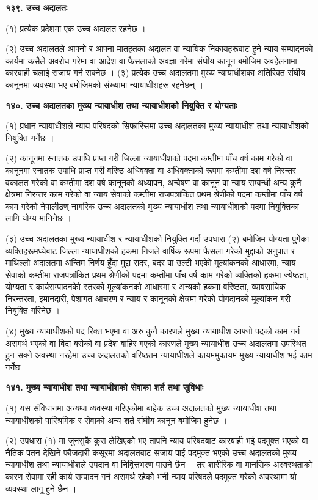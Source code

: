 \textbf{१३९. उच्च अदालतः}

(१) प्रत्येक प्रदेशमा एक उच्च अदालत रहनेछ ।

(२) उच्च अदालतले आफ्नो र आफ्ना मातहतका अदालत वा न्यायिक निकायहरूबाट हुने न्याय सम्पादनको कार्यमा कसैले अवरोध गरेमा वा आदेश वा फैसलाको अवज्ञा गरेमा संघीय कानून बमोजिम अवहेलनामा कारबाही चलाई सजाय गर्न सक्नेछ ।
(३) प्रत्येक उच्च अदालतमा मुख्य न्यायाधीशका अतिरिक्त संघीय कानूनमा व्यवस्था भए बमोजिमको संख्यामा न्यायाधीशहरू रहनेछन् ।

\textbf{१४०. उच्च अदालतका मुख्य न्यायाधीश तथा न्यायाधीशको नियुक्ति र योग्यताः}

(१) प्रधान न्यायाधीशले न्याय परिषदको सिफारिसमा उच्च अदालतका मुख्य न्यायाधीश तथा न्यायाधीशको नियुक्ति गर्नेछ ।

(२) कानूनमा स्नातक उपाधि प्राप्त गरी जिल्ला न्यायाधीशको पदमा कम्तीमा पाँच वर्ष काम गरेको वा कानूनमा स्नातक उपाधि प्राप्त गरी वरिष्ठ अधिवक्ता वा अधिवक्ताको रूपमा कम्तीमा दश वर्ष निरन्तर वकालत गरेको वा कम्तीमा दश वर्ष कानूनको अध्यापन, अन्वेषण वा कानून वा न्याय सम्बन्धी अन्य कुनै क्षेत्रमा निरन्तर काम गरेको वा न्याय सेवाको कम्तीमा राजपत्रांकित प्रथम श्रेणीको पदमा कम्तीमा पाँच वर्ष काम गरेको नेपालीठण् नागरिक उच्च अदालतको मुख्य न्यायाधीश तथा न्यायाधीशको पदमा नियुक्तिका लागि योग्य मानिनेछ ।

(३) उच्च अदालतका मुख्य न्यायाधीश र न्यायाधीशको नियुक्ति गर्दा उपधारा (२) बमोजिम योग्यता पुुगेका व्यक्तिहरूमध्येबाट जिल्ला
न्यायाधीशको हकमा निजले वार्षिक रूपमा फैसला गरेको मुद्दाको अनुपात र माथिल्लो अदालतमा अन्तिम निर्णय हुँदा मुद्दा सदर, बदर वा उल्टी भएकोे मूल्यांकनको आधारमा, न्याय सेवाको कम्तीमा राजपत्रांकित प्रथम श्रेणीको पदमा कम्तीमा पाँच वर्ष काम गरेको व्यक्तिको हकमा ज्येष्ठता, योग्यता र कार्यसम्पादनकोे स्तरको मूल्यांकनको आधारमा र अन्यको हकमा वरिष्ठता, व्यावसायिक निरन्तरता, इमानदारी, पेशागत आचरण र न्याय र कानूनको क्षेत्रमा गरेको योगदानको मूल्यांकन गरी नियुक्ति गरिनेछ ।

(४) मुख्य न्यायाधीशको पद रिक्त भएमा वा अरु कुनै कारणले मुख्य न्यायाधीश आफ्नो पदको काम गर्न असमर्थ भएको वा बिदा बसेको वा प्रदेश बाहिर गएको कारणले मुख्य न्यायाधीश उच्च अदालतमा उपस्थित हुन सक्ने अवस्था नरहेमा उच्च अदालतको वरिष्ठतम न्यायाधीशले कायममुकायम मुख्य न्यायाधीश भई काम गर्नेेछ ।

\textbf{१४१. मुख्य न्यायाधीश तथा न्यायाधीशको सेवाका शर्त तथा सुविधाः}

(१) यस संविधानमा अन्यथा व्यवस्था गरिएकोमा बाहेक उच्च अदालतको मुख्य न्यायाधीश तथा न्यायाधीशको पारिश्रमिक र सेवाको अन्य शर्त संघीय कानून बमोजिम हुनेछ ।

(२) उपधारा (१) मा जुनसुकै कुरा लेखिएको भए तापनि न्याय परिषदबाट कारबाही भई पदमुक्त भएको वा नैतिक पतन देखिने फौजदारी
कसूरमा अदालतबाट सजाय पाई पदमुक्त भएको उच्च अदालतको मुख्य न्यायाधीश तथा न्यायाधीशले उपदान वा निवृित्तभरण पाउने छैन ।
तर शारीरिक वा मानसिक अस्वस्थताको कारण सेवामा रही कार्य सम्पादन गर्न असमर्थ रहेको भनी न्याय परिषदले पदमुक्त गरेको अवस्थामा यो व्यवस्था लागू हुने छैन ।

